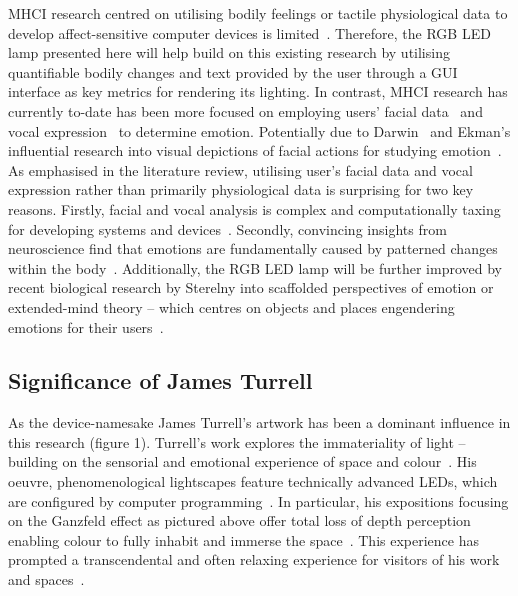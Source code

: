 \documentclass{sigchi}
\begin{document}
MHCI research centred on utilising bodily feelings or tactile physiological data to develop affect-sensitive computer devices is limited~\cite{pantic2008human}. Therefore, the RGB LED lamp presented here will help build on this existing research by utilising quantifiable bodily changes and text provided by the user through a GUI interface as key metrics for rendering its lighting. In contrast, MHCI research has currently to-date has been more focused on employing users’ facial data~\cite{yang2015lighting} and vocal expression~\cite{davletcharova2015detection} to determine emotion. Potentially due to Darwin~\cite{hess2009darwin} and Ekman’s influential research into visual depictions of facial actions for studying emotion~\cite{ekman1992facial, ekman2003darwin, ekman2006darwin}. As emphasised in the literature review, utilising user’s facial data and vocal expression rather than primarily physiological data is surprising for two key reasons. Firstly, facial and vocal analysis is complex and computationally taxing for developing systems and devices~\cite{marechal2019survey}. Secondly, convincing insights from neuroscience find that emotions are fundamentally caused by patterned changes within the body~\cite{colombetti2014feeling, james1922emotions, laricchiuta2015embodied}. Additionally, the RGB LED lamp will be further improved by recent biological research by Sterelny into scaffolded perspectives of emotion or extended-mind theory – which centres on objects and places engendering emotions for their users~\cite{colombetti2015scaffoldings, sterelny2010minds, sterelny2004externalism}.


\subsection{Significance of James Turrell}

As the device-namesake James Turrell’s artwork has been a dominant influence in this research (figure 1). Turrell’s work explores the immateriality of light – building on the sensorial and emotional experience of space and colour~\cite{adcock1990james}. His oeuvre, phenomenological lightscapes feature technically advanced LEDs, which are configured by computer programming~\cite{hylton2013james}. In particular, his expositions focusing on the Ganzfeld effect as pictured above offer total loss of depth perception enabling colour to fully inhabit and immerse the space~\cite{basse2016light}. This experience has prompted a transcendental and often relaxing experience for visitors of his work and spaces~\cite{adcock1990james, basse2016light}.
\end{document}
